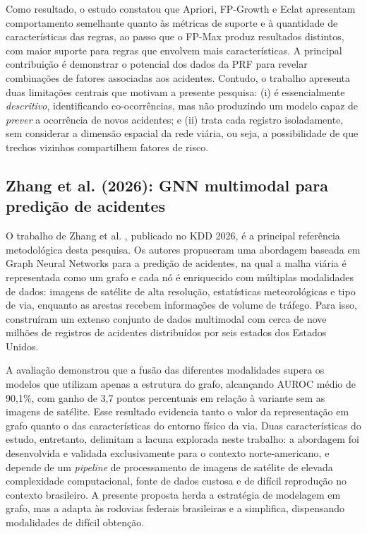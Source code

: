 \documentclass[12pt]{article}
\begin{document}
Como resultado, o estudo constatou que Apriori, FP-Growth e Eclat
apresentam comportamento semelhante quanto às métricas de suporte e à
quantidade de características das regras, ao passo que o FP-Max produz
resultados distintos, com maior suporte para regras que envolvem mais
características. A principal contribuição é demonstrar o potencial dos
dados da PRF para revelar combinações de fatores associadas aos
acidentes. Contudo, o trabalho apresenta duas limitações centrais que
motivam a presente pesquisa: (i) é essencialmente \textit{descritivo},
identificando co-ocorrências, mas não produzindo um modelo capaz de
\textit{prever} a ocorrência de novos acidentes; e (ii) trata cada
registro isoladamente, sem considerar a dimensão espacial da rede
viária, ou seja, a possibilidade de que trechos vizinhos compartilhem
fatores de risco.

\subsection{Zhang et al. (2026): GNN multimodal para predição de acidentes}

O trabalho de Zhang et al. \cite{zhang2026}, publicado no KDD 2026, é a
principal referência metodológica desta pesquisa. Os autores propuseram
uma abordagem baseada em Graph Neural Networks para a predição de
acidentes, na qual a malha viária é representada como um grafo e cada nó
é enriquecido com múltiplas modalidades de dados: imagens de satélite de
alta resolução, estatísticas meteorológicas e tipo de via, enquanto as
arestas recebem informações de volume de tráfego. Para isso,
construíram um extenso conjunto de dados multimodal com cerca de nove
milhões de registros de acidentes distribuídos por seis estados dos
Estados Unidos.

A avaliação demonstrou que a fusão das diferentes modalidades supera os
modelos que utilizam apenas a estrutura do grafo, alcançando AUROC médio
de 90,1\%, com ganho de 3,7 pontos percentuais em relação à variante sem
as imagens de satélite. Esse resultado evidencia tanto o valor da
representação em grafo quanto o das características do entorno físico da
via. Duas características do estudo, entretanto, delimitam a lacuna
explorada neste trabalho: a abordagem foi desenvolvida e validada
exclusivamente para o contexto norte-americano, e depende de um
\textit{pipeline} de processamento de imagens de satélite de elevada
complexidade computacional, fonte de dados custosa e de difícil
reprodução no contexto brasileiro. A presente proposta herda a
estratégia de modelagem em grafo, mas a adapta às rodovias federais
brasileiras e a simplifica, dispensando modalidades de difícil obtenção.
\end{document}
